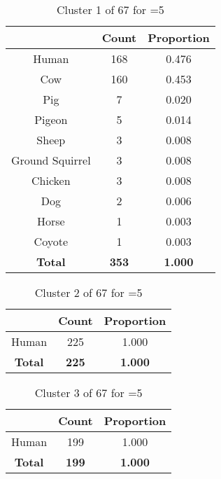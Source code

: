\begin{table}[ht!]
\centering
\begin{tabular}{|c|c|c|}
\hline
\bf \Spec{} &\bf Count &\bf Proportion\\ \hline \hline
Human & 168 & 0.476\\ \hline
Cow & 160 & 0.453\\ \hline
Pig & 7 & 0.020\\ \hline
Pigeon & 5 & 0.014\\ \hline
Sheep & 3 & 0.008\\ \hline
Ground Squirrel & 3 & 0.008\\ \hline
Chicken & 3 & 0.008\\ \hline
Dog & 2 & 0.006\\ \hline
Horse & 1 & 0.003\\ \hline
Coyote & 1 & 0.003\\ \hline
\hline
\bf Total & \bf 353 & \bf 1.000\\ \hline
\end{tabular}
\label{tab:cluster:1:5}
\caption{Cluster 1 of 67 for \minneigh{}=5}
\end{table}

\begin{table}[ht!]
\centering
\begin{tabular}{|c|c|c|}
\hline
\bf \Spec{} &\bf Count &\bf Proportion\\ \hline \hline
Human & 225 & 1.000\\ \hline
\hline
\bf Total & \bf 225 & \bf 1.000\\ \hline
\end{tabular}
\label{tab:cluster:2:5}
\caption{Cluster 2 of 67 for \minneigh{}=5}
\end{table}

\begin{table}[ht!]
\centering
\begin{tabular}{|c|c|c|}
\hline
\bf \Spec{} &\bf Count &\bf Proportion\\ \hline \hline
Human & 199 & 1.000\\ \hline
\hline
\bf Total & \bf 199 & \bf 1.000\\ \hline
\end{tabular}
\label{tab:cluster:3:5}
\caption{Cluster 3 of 67 for \minneigh{}=5}
\end{table}

